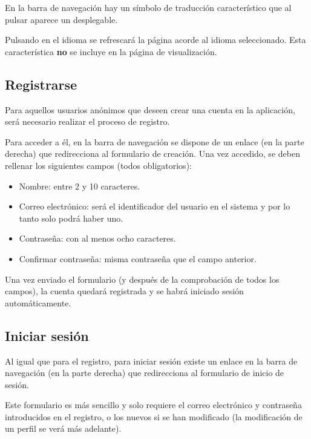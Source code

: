 En la barra de navegación hay un símbolo de traducción característico que al
pulsar aparece un desplegable.


Pulsando en el idioma se refrescará la página acorde al idioma seleccionado.
Esta característica \textbf{no} se incluye en la página de visualización.

\subsection{Registrarse}

Para aquellos usuarios anónimos que deseen crear una cuenta en la aplicación,
será necesario realizar el proceso de registro.

Para acceder a él, en la barra de navegación se dispone de un enlace (en la
parte derecha) que redirecciona al formulario de creación. Una vez accedido, se
deben rellenar los siguientes campos (todos obligatorios):
\begin{itemize}
    \item Nombre: entre 2 y 10 caracteres.
    \item Correo electrónico: será el identificador del usuario en el sistema y
    por lo tanto solo podrá haber uno.
    \item Contraseña: con al menos ocho caracteres.
    \item Confirmar contraseña: misma contraseña que el campo anterior.
\end{itemize}


Una vez enviado el formulario (y después de la comprobación de todos los
campos), la cuenta quedará registrada y se habrá iniciado sesión
automáticamente.

\subsection{Iniciar sesión}

Al igual que para el registro, para iniciar sesión existe un enlace en la barra
de navegación (en la parte derecha) que redirecciona al formulario de inicio de
sesión.


Este formulario es más sencillo y solo requiere el correo electrónico y
contraseña introducidos en el registro, o los nuevos si se han modificado (la
modificación de un perfil se verá más adelante).

